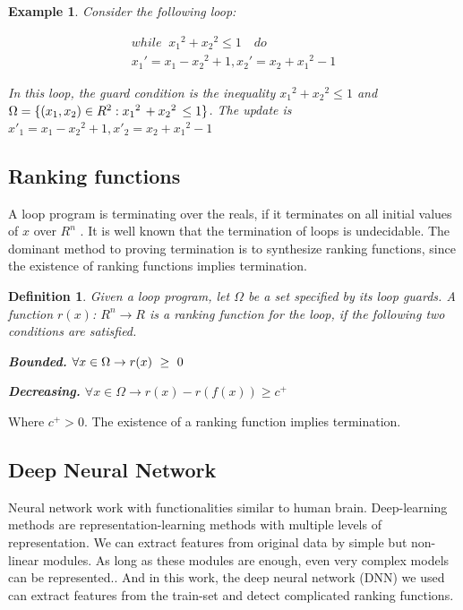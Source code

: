\newtheorem{exam}{Example}
\begin{exam}
	\label{exam1}
	Consider the following loop:
	
	$$\begin{array}{l}
	while\;\;{x_1}^2 + {x_2}^2 \le 1\quad do\\
	{{x_1}'} = {x_1} - {x_2}^2 + 1,{{x_2}'} = {x_2} + {x_1}^2 - 1
	\end{array}$$
	
	In this loop, the guard condition is the inequality ${x_1}^2 + {x_2}^2 \le 1$ and $\Omega  = \{({x_{\rm{1}}},{x_2})\in R^2:{x_1}^2\, + {x_2}^2\, \le 1\} $. The update is 
	${x'_1} = {x_1} - {x_2}^2 + 1,{x'_2} = {x_2} + {x_1}^2 - 1$
	
\end{exam}
\subsection{Ranking functions}
\label{Ranking functions}
A loop program is terminating over the reals, if it terminates on all initial values of $x$ over ${R^n}$ . It is well known that the termination of loops is undecidable. The dominant method to proving termination is to synthesize ranking functions, since the existence of ranking functions implies termination.
\newtheorem{mydef}{Definition}
\begin{mydef} \label{def}
	Given a loop program, let $\Omega$ be a set specified by its loop guards. A function $r(x)$: ${R^n} \to R$ is a ranking function for the loop, if the following two conditions are satisfied.
	\begin{flushleft}
		{\bfseries Bounded.} $\forall x \in \Omega  \to r(x)\,\, \ge \,\,{\rm{0}}$
		
		{\bfseries Decreasing.} $\forall x \in \Omega  \to r(x) - r(f(x)) \ge c^+$
	\end{flushleft}
\end{mydef}
Where $c^+ > 0$. The existence of a ranking function implies termination.
\subsection{Deep Neural Network}
\label{Deep Neural Network}
Neural network work with functionalities similar to human brain. Deep-learning methods are
representation-learning methods with multiple levels of representation. We can extract features from original data by simple but non-linear modules. As long as these modules are enough, even very complex models can be represented.\cite{lecun2015deep}. And in this work, the deep neural network (DNN) we used can extract features from the train-set and detect complicated ranking functions.

